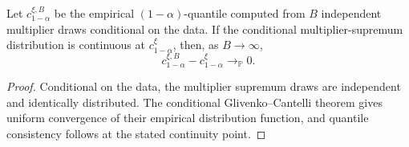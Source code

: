 \begin{proposition}
\label{prop:finite-B}
Let \(c_{1-\alpha}^{\xi,B}\) be the empirical \((1-\alpha)\)-quantile computed from \(B\) independent multiplier draws conditional on the data. If the conditional multiplier-supremum distribution is continuous at \(c_{1-\alpha}^{\xi}\), then, as \(B\to\infty\),
\[
c_{1-\alpha}^{\xi,B}-c_{1-\alpha}^{\xi}
\to_{\mathbb P}0.
\]
\end{proposition}

\begin{proof}
Conditional on the data, the multiplier supremum draws are independent and identically distributed. The conditional Glivenko--Cantelli theorem gives uniform convergence of their empirical distribution function, and quantile consistency follows at the stated continuity point.
\end{proof}

